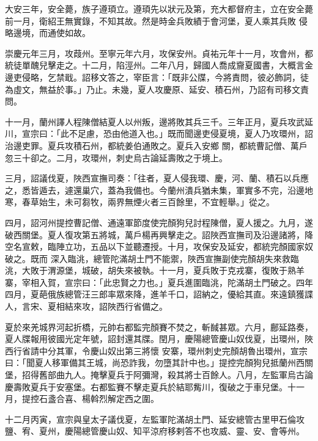 \begin{pinyinscope}
 大安三年，安全薨，族子遵頊立。遵頊先以狀元及第，充大都督府主，立在安全薨前一月，衛紹王無實錄，不知其故。然是時金兵敗績于會河堡，夏人乘其兵敗
 侵略邊境，而通使如故。



 崇慶元年三月，攻葭州。至寧元年六月，攻保安州。貞祐元年十一月，攻會州，都統徒單醜兒擊走之。十二月，陷涇州。二年八月，歸國人喬成齎夏國書，大概言金邊吏侵略，乞禁戢。詔移文答之，宰臣言：「既非公牒，今將責問，彼必飾詞，徒為虛文，無益於事。」乃止。未幾，夏人攻慶原、延安、積石州，乃詔有司移文責問。



 十一月，蘭州譯人程陳僧結夏人以州叛，邊將敗其兵三千。三年正月，夏兵攻武延川，宣宗曰：「此不足慮，恐由他道入也。」既而聞邊吏侵夏境，夏人乃攻環州，詔治邊吏罪。夏兵攻積石州，都統姜伯通敗之。夏兵入安鄉
 關，都統曹記僧、萬戶忽三十卻之。二月，攻環州，刺史烏古論延壽敗之于境上。



 三月，詔議伐夏，陜西宣撫司奏：「往者，夏人侵我環、慶，河、蘭、積石以兵應之，悉皆遁去，遽還巢穴，蓋為我備也。今蘭州潰兵猶未集，軍實多不完，沿邊地寒，春草始生，未可芻牧，兩界無煙火者三百餘里，不宜輕舉。」從之。



 四月，詔河州提控曹記僧、通遠軍節度使完顏狗兒討程陳僧，夏人援之。九月，遂破西關堡。夏人復攻第五將城，萬戶楊再興擊走之。詔陜西宣撫司及沿邊諸將，降空名宣敕，臨陣立功，五品以下並聽遷授。十月，攻保安及延安，都統完顏國家奴破之。既而
 深入臨洮，總管陀滿胡土門不能禦，陜西宣撫副使完顏胡失來救臨洮，大敗于渭源堡，城破，胡失來被執。十一月，夏兵敗于克戎寨，復敗于熟羊寨，宰相入賀，宣宗曰：「此忠賢之力也。」夏兵進圍臨洮，陀滿胡土門破之。四年四月，夏葩俄族總管汪三郎率眾來降，進羊千口，詔納之，優給其直。來遠鎮獲諜人，言宋、夏相結來攻，詔陜西行省備之。



 夏於來羌城界河起折橋，元帥右都監完顏賽不焚之，斬馘甚眾。六月，鄜延路奏，夏人牒報用彼國光定年號，詔封還其牒。閏月，慶陽總管慶山奴伐夏，出環州，陜西行省請中分其軍，令慶山奴出第三將懷
 安寨，環州刺史完顏胡魯出環州，宣宗曰：「聞夏人移軍備其王城，尚恐詐我，勿墮其計中也。」提控完顏狗兒抵蘭州西關堡，招得舊部曲九人。掩擊夏兵于阿彌灣，殺其將士百餘人。八月，左監軍烏古論慶壽敗夏兵于安塞堡。右都監賽不擊走夏兵於結耶觜川，復破之于車兒堡。十一月，提控石盞合喜、楊斡烈解定西之圍。



 十二月丙寅，宣宗與皇太子議伐夏，左監軍陀滿胡土門、延安總管古里甲石倫攻鹽、宥、夏州，慶陽總管慶山奴、知平涼府移剌答不也攻威、靈、安、會等州。




\end{pinyinscope}
